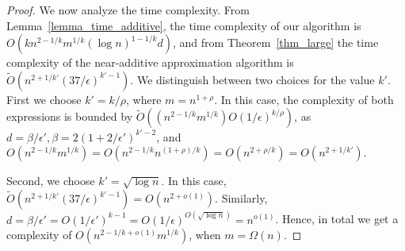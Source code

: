 \documentclass[11pt]{article}
\makeatletter
\theoremstyle{definition}
\theoremstyle{remark}
\newcommand{\ttodo}[1]{\todo[color=orange!20]{T: #1}}
\newcommand{\remove}[1]{}
\DeclareMathOperator{\E}{\mathbb E}
\renewcommand{\paragraph}{%
  \@startsection{paragraph}{4}%
  {\z@}{1.4ex \@plus 1ex \@minus .2ex}{-1em}%
  {\normalfont\normalsize\bfseries}%
}
\makeatother
\begin{document}
\begin{titlepage}
\begin{proof}
We now analyze the time complexity. From Lemma~\ref{lemma_time_additive}, the time complexity of our algorithm is $O(kn^{2-1/k}m^{1/k}(\log{n})^{1-1/k} d)$, and from Theorem~\ref{thm_large} the time complexity of the near-additive approximation algorithm is $\tilde{O}(n^{2+1/k'} (37/\epsilon)^{k'-1})$.
We distinguish between two choices for the value $k'$. First we choose $k' = k/\rho$, where $m=n^{1+\rho}$. In this case, the complexity of both expressions is bounded by $\tilde{O}((n^{2-1/k}m^{1/k}) O(1/\epsilon)^{k/\rho})$, as $d=\beta/\epsilon', \beta= 2(1+2/\epsilon')^{k'-2}$, and $O(n^{2-1/k}m^{1/k})=O(n^{2-1/k}n^{(1+\rho)/k})=O(n^{2+\rho/k})=O(n^{2+1/k'})$.

Second, we choose $k' = \sqrt{\log{n}}$. In this case, $\tilde{O}(n^{2+1/k'} (37/\epsilon)^{k'-1})= O(n^{2+o(1)})$. Similarly, $d= \beta/\epsilon' = O(1/\epsilon')^{k-1}= O(1/\epsilon)^{O(\sqrt{\log{n}})}=n^{o(1)}$. Hence, in total we get a complexity of $O(n^{2-1/k+o(1)}m^{1/k})$, when $m=\Omega(n)$.
\end{proof}




\remove{
\paragraph{Dominator edges.} Each time we exchange an edge in $E_i^*$ this takes $O(n)$ time to update all $n$ ES-trees on $G_{u,i}$. We bound the total number of candidate edges for $E_i^*$ to get an upper bound on the total update time needed to make these changes. Suppose $D_i$ is created by sampling each node with probability $\tfrac{\log(n)}{d_i}$\ttodo{is this correct?}, then we get in expectation:
\begin{align*}
    \E\left[ \left|E \cap \left(V \times D_i\right)\right|\right] &= \E\left[ \sum_{v\in V} \left|E_{i+1} \cap \left(\{v\} \times D_i\right)\right|\right] \\
    &= \sum_{(u,v)\in E_i} \E\left[  u\in D_i\right] \\
    &= \sum_{(u,v)\in E_i} \tfrac{\log(n)}{d_i} \\
    &= |E_i|\tfrac{\log(n)}{d_i} \\
    &\leq nd_i\tfrac{\log(n)}{d_i} \\
    &= n\log(n)
\end{align*}
So for all $n$ trees, we obtain $O\left(n^2\log(n)\right)=\tilde O\left(n^2\right) $  time. And in total for all $i=1,\dots k-1$ we obtain total update time $\tilde O\left(kn^2\right) $, which is dominated by $\tilde{O}(n^{2-1/k}m^{1/k})$.

}
\end{titlepage}
\end{document}
